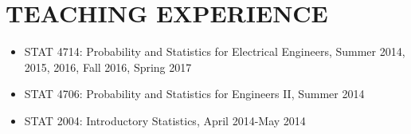 \documentclass[10pt]{article}
\begin{document}
\section*{TEACHING EXPERIENCE}
\begin{itemize}
\item STAT 4714: Probability and Statistics for Electrical Engineers, Summer 2014, 2015, 2016, Fall 2016, Spring 2017
\item STAT 4706: Probability and Statistics for Engineers II, Summer 2014
\item STAT 2004: Introductory Statistics, April 2014-May 2014
\end{itemize}
\end{document}
